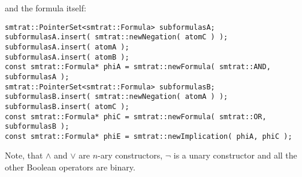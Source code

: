 \normalsize
and the formula itself:
\scriptsize
\begin{verbatim}
smtrat::PointerSet<smtrat::Formula> subformulasA;
subformulasA.insert( smtrat::newNegation( atomC ) );
subformulasA.insert( atomA );
subformulasA.insert( atomB );
const smtrat::Formula* phiA = smtrat::newFormula( smtrat::AND, subformulasA );
smtrat::PointerSet<smtrat::Formula> subformulasB;
subformulasB.insert( smtrat::newNegation( atomA ) );
subformulasB.insert( atomC );
const smtrat::Formula* phiC = smtrat::newFormula( smtrat::OR, subformulasB );
const smtrat::Formula* phiE = smtrat::newImplication( phiA, phiC );
\end{verbatim}
\normalsize
Note, that $\land$ and $\lor$ are $n$-ary constructors, $\neg$ is a unary constructor and all the other Boolean operators are binary.

